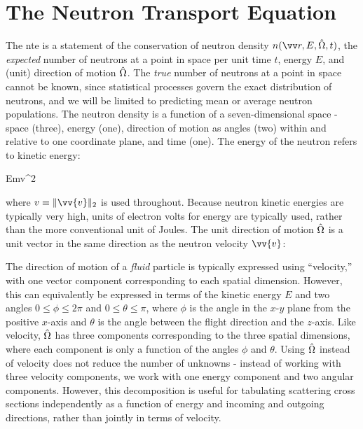 \section{The Neutron Transport Equation}
\label{sec:CE_NTE}

The \gls{nte} is a statement of the conservation of neutron density \(n\seat\), the {\it expected} number of neutrons at a point in space per unit time \(t\), energy \(E\), and (unit) direction of motion \(\hat{\Omega}\). The {\it true} number of neutrons at a point in space cannot be known, since statistical processes govern the exact distribution of neutrons, and we will be limited to predicting mean or average neutron populations. The neutron density is a function of a seven-dimensional space - space (three), energy (one), direction of motion as angles (two) within and relative to one coordinate plane, and time (one). The energy of the neutron refers to kinetic energy:

\beq
\label{eq:KineticEnergyDef}
E\equiv{}mv^2
\eeq

where \(v\equiv\|\vv{v}\|_2\) is used throughout. Because neutron kinetic energies are typically very high, units of electron volts for energy are typically used, rather than the more conventional unit of Joules. The unit direction of motion \(\hat{\Omega}\) is a unit vector in the same direction as the neutron velocity \(\vv{v}\):

\beq
\label{eq:OmegaDef}
\hO\equiv {}
\eeq

The direction of motion of a {\it fluid} particle is typically expressed using ``velocity,'' with one vector component corresponding to each spatial dimension. However, this can equivalently be expressed in terms of the kinetic energy \(E\) and two angles \(0\leq\phi\leq2\pi\) and \(0\leq\theta\leq\pi\), where \(\phi\) is the angle in the \(x\)-\(y\) plane from the positive \(x\)-axis and \(\theta\) is the angle between the flight direction and the \(z\)-axis. Like velocity, \(\hat{\Omega}\) has three components corresponding to the three spatial dimensions, where each component is only a function of the angles \(\phi\) and \(\theta\). Using \(\hat{\Omega}\) instead of velocity does not reduce the number of unknowns - instead of working with three velocity components, we work with one energy component and two angular components. However, this decomposition is useful for tabulating scattering cross sections independently as a function of energy and incoming and outgoing directions, rather than jointly in terms of velocity.

